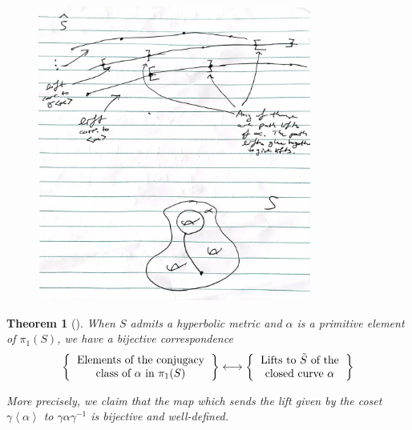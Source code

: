 \documentclass[reqno]{amsart}
\newtheorem{theorem}{Theorem}[section]
\theoremstyle{definition}
\theoremstyle{remark}
\begin{document}
 \begin{figure}[http]
     \centering
     \includegraphics[width=0.8\textwidth]{lifts-of-paths.jpg}
     \caption{}
     \label{fig:lifts-of-paths}
 \end{figure}

 \begin{theorem}[]
When $S$ admits a hyperbolic metric and
$\alpha$ is a primitive element of $\pi_1 (S)$, we have
a bijective correspondence
\[
\left\{ 
    \begin{tabular}{c}
    Elements of the conjugacy\\
    class of $\alpha$ in $\pi_1 (S)$
\end{tabular}
\right\} 
\longleftrightarrow
\left\{ 
    \begin{tabular}{c}
    Lifts to $\tilde{S}$ of the\\
    closed curve $\alpha$
\end{tabular}
\right\} 
\] 


More precisely, we claim that the map which sends the lift
given by the coset $\gamma \left<\alpha \right>$ to
$\gamma \alpha \gamma^{-1}$ is bijective and well-defined.\\
 \end{theorem}
\end{document}
